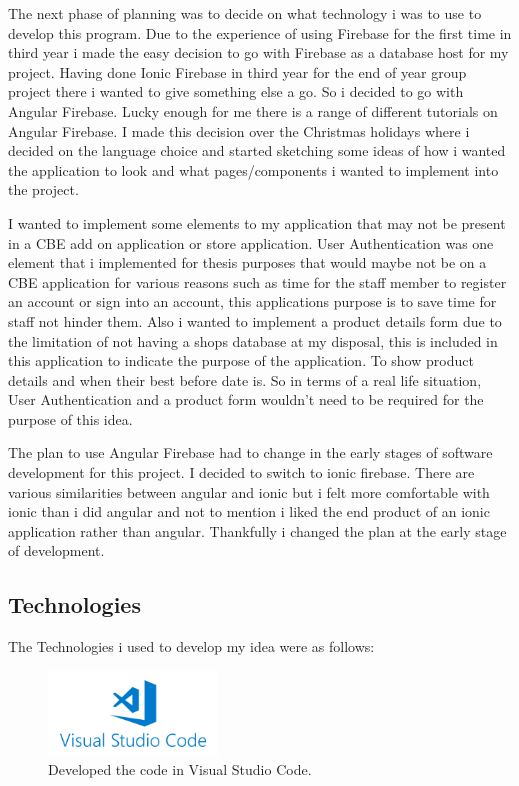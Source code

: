 The next phase of planning was to decide on what technology i was to use to develop this program. Due to the experience of using Firebase for the first time in third year i made the easy decision to go with Firebase as a database host for my project. Having done Ionic Firebase in third year for the end of year group project there i wanted to give something else a go. So i decided to go with Angular Firebase. Lucky enough for me there is a range of different tutorials on Angular Firebase. I made this decision over the Christmas holidays where i decided on the language choice and started sketching some ideas of how i wanted the application to look and what pages/components i wanted to implement into the project. 
\newline

I wanted to implement some elements to my application that may not be present in a CBE add on application or store application. User Authentication was one element that i implemented for thesis purposes that would maybe not be on a CBE application for various reasons such as time for the staff member to register an account or sign into an account, this applications purpose is to save time for staff not hinder them. Also i wanted to implement a product details form due to the limitation of not having a shops database at my disposal, this is included in this application to indicate the purpose of the application. To show product details and when their best before date is. So in terms of a real life situation, User Authentication and a product form wouldn't need to be required for the purpose of this idea. 
\newline

The plan to use Angular Firebase had to change in the early stages of software development for this project. I decided to switch to ionic firebase. There are various similarities between angular and ionic but i felt more comfortable with ionic than i did angular and not to mention i liked the end product of an ionic application rather than angular. Thankfully i changed the plan at the early stage of development.

\subsection{Technologies}
The Technologies i used to develop my idea were as follows:
\newline

\begin{figure}[h!]
	\caption{Developed the code in Visual Studio Code.}
	\label{image:vscode}
	\centering
	\includegraphics[width=0.4\textwidth]{images/vscode.png}
\end{figure}

